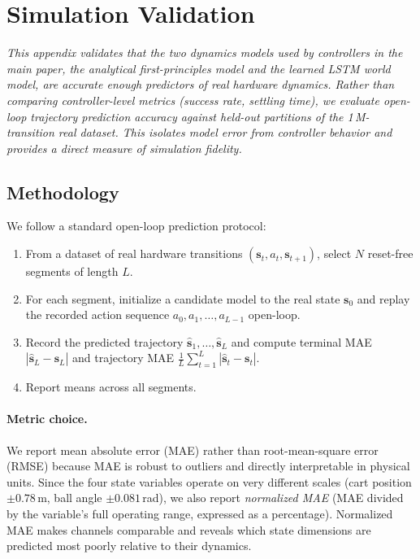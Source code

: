 \section{Simulation Validation}
\label{appendix:simulation_validation}

\noindent\textit{This appendix validates that the two dynamics models used by
controllers in the main paper, the analytical first-principles model and the
learned LSTM world model, are accurate enough predictors of real hardware
dynamics.  Rather than comparing controller-level metrics (success rate,
settling time), we evaluate open-loop trajectory prediction accuracy against
held-out partitions of the 1\,M-transition real dataset.  This isolates model error from
controller behavior and provides a direct measure of simulation fidelity.}

\subsection{Methodology}
\label{sec:sim_val_method}

We follow a standard open-loop prediction protocol:
\begin{enumerate}
  \item From a dataset of real hardware transitions
        $(\mathbf{s}_t, a_t, \mathbf{s}_{t+1})$, select $N$ reset-free
        segments of length $L$.
  \item For each segment, initialize a candidate model to the real state
        $\mathbf{s}_0$ and replay the recorded action sequence
        $a_0, a_1, \dots, a_{L-1}$ open-loop.
  \item Record the predicted trajectory
        $\hat{\mathbf{s}}_1, \dots, \hat{\mathbf{s}}_L$ and compute
        terminal MAE $|\hat{\mathbf{s}}_L - \mathbf{s}_L|$ and
        trajectory MAE $\frac{1}{L}\sum_{t=1}^{L} |\hat{\mathbf{s}}_t - \mathbf{s}_t|$.
  \item Report means across all segments.
\end{enumerate}

\paragraph{Metric choice.}
We report mean absolute error (MAE) rather than root-mean-square error (RMSE)
because MAE is robust to outliers and directly interpretable in physical units.
Since the four state variables operate on very different scales (cart position
$\pm 0.78$\,m, ball angle $\pm 0.081$\,rad), we also report \emph{normalized MAE}
(MAE divided by the variable's full operating range, expressed as a percentage).
Normalized MAE makes channels comparable and reveals which state dimensions
are predicted most poorly relative to their dynamics.

